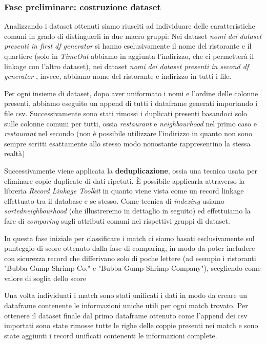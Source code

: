\documentclass[a4paper,12pt]{article}
\begin{document}
\subsubsection{Fase preliminare: costruzione dataset}
Analizzando i dataset ottenuti siamo riusciti ad individuare delle caratteristiche comuni in grado di distinguerli in due macro gruppi:
Nei dataset \textit{nomi dei dataset presenti in first df generator} %
si hanno esclusivamente il nome del ristorante e il quartiere (solo in \textit{TimeOut} abbiamo in aggiunta l'indirizzo, che ci permetterà il linkage con l'altro dataset), nei dataset \textit{nomi dei dataset presenti in second df generator} %
, invece, abbiamo nome del ristorante e indirizzo in tutti i file.

Per ogni insieme di dataset, dopo aver uniformato i nomi e l'ordine delle colonne presenti, abbiamo eseguito un append di tutti i dataframe generati importando i file csv. 
Successivamente sono stati rimossi i duplicati presenti basandoci solo sulle colonne comuni per tutti, ossia \textit{restaurant} e \textit{neighbourhood} nel primo caso e \textit{restaurant} nel secondo (non è possibile utilizzare l'indirizzo in quanto non sono sempre scritti esattamente allo stesso modo nonostante rappresentino la stessa realtà) %

Successivamente viene applicata la \textbf{deduplicazione}, ossia una tecnica usata per eliminare copie duplicate di dati ripetuti. È possibile applicarla attraverso la libreria \textit{Record Linkage Toolkit} in quanto viene vista come un record linkage effettuato tra il database e se stesso. Come tecnica di \textit{indexing} usiamo \textit{sortedneighbourhood} (che illustreremo in dettaglio in seguito) ed effettuiamo la fare di \textit{comparing} sugli attributi comuni nei rispettivi gruppi di dataset.

In questa fase iniziale per classificare i match ci siamo basati esclusivamente sul punteggio di score ottenuto dalla fase di comparing, in modo da poter includere con sicurezza record che differivano solo di poche lettere (ad esempio i ristoranti "Bubba Gump Shrimp Co." e "Bubba Gump Shrimp Company"), scegliendo come valore di soglia dello score %

Una volta individuati i match sono stati unificati i dati in modo da creare un dataframe contenente le informazioni uniche utili per ogni match trovato. Per ottenere il dataset finale dal primo dataframe ottenuto come l'append dei csv importati sono state rimosse tutte le righe delle coppie presenti nei match e sono state aggiunti i record unificati contenenti le informazioni complete.
\end{document}
